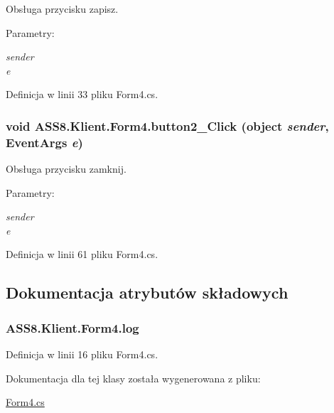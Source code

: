 Obsługa przycisku zapisz. 

\begin{Desc}
\item[Parametry:]
\begin{description}
\item[{\em sender}]\item[{\em e}]\end{description}
\end{Desc}


Definicja w linii 33 pliku Form4.cs.\hypertarget{a00005_a3ef6122bae46a2c4f90562b75b060b5}{
\subsubsection[{button2\_\-Click}]{\setlength{\rightskip}{0pt plus 5cm}void ASS8.Klient.Form4.button2\_\-Click (object {\em sender}, \/  EventArgs {\em e})}}
\label{dd/dad/a00005_a3ef6122bae46a2c4f90562b75b060b5}


Obsługa przycisku zamknij. 

\begin{Desc}
\item[Parametry:]
\begin{description}
\item[{\em sender}]\item[{\em e}]\end{description}
\end{Desc}


Definicja w linii 61 pliku Form4.cs.

\subsection{Dokumentacja atrybutów składowych}
\hypertarget{a00005_182469cf0d560d301c293d4961b44550}{
\subsubsection[{log}]{ {\bf ASS8.Klient.Form4.log}}}
\label{dd/dad/a00005_182469cf0d560d301c293d4961b44550}




Definicja w linii 16 pliku Form4.cs.

Dokumentacja dla tej klasy została wygenerowana z pliku:\begin{CompactItemize}
\item 
\hyperlink{a00047}{Form4.cs}\end{CompactItemize}
